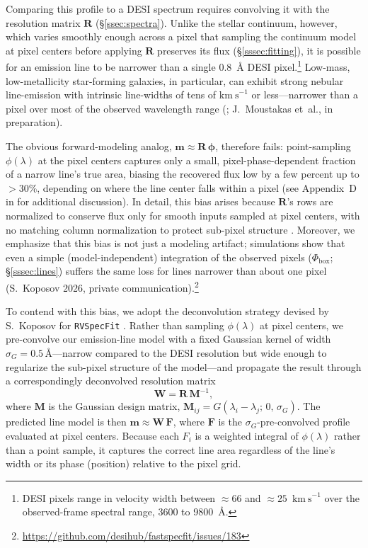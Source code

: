 \documentclass[modern,linenumbers]{aastex701}
\newcommand{\kms}{\ensuremath{\mathrm{km~s}^{-1}}}
\begin{document}
Comparing this profile to a DESI spectrum requires convolving it with
the resolution matrix $\mathbf{R}$ (\S\ref{ssec:spectra}). Unlike the
stellar continuum, however, which varies smoothly enough across a
pixel that sampling the continuum model at pixel centers before
applying $\mathbf{R}$ preserves its flux (\S\ref{sssec:fitting}), it
is possible for an emission line to be narrower than a single
0.8~\AA{} DESI pixel.\footnote{DESI pixels range in velocity width
between $\approx66$ and $\approx25$~\kms{} over the observed-frame
spectral range, 3600 to 9800~\AA.} Low-mass, low-metallicity
star-forming galaxies, in particular, can exhibit strong nebular
line-emission with intrinsic line-widths of tens of \kms{} or
less---narrower than a pixel over most of the observed wavelength
range (\citealt{scholte26a}; J.~Moustakas et~al., in preparation).

The obvious forward-modeling analog, $\mathbf{m} \approx
\mathbf{R}\,\boldsymbol{\phi}$, therefore fails: point-sampling
$\phi(\lambda)$ at the pixel centers captures only a small,
pixel-phase-dependent fraction of a narrow line's true area, biasing
the recovered flux low by a few percent up to $>$30\%, depending on
where the line center falls within a pixel (see Appendix~D in
\citealt{guy23a} for additional discussion). In detail, this bias
arises because $\mathbf{R}$'s rows are normalized to conserve flux
only for smooth inputs sampled at pixel centers, with no matching
column normalization to protect sub-pixel structure
\citep{guy23a}. Moreover, we emphasize that this bias is not just a
modeling artifact; simulations show that even a simple
(model-independent) integration of the observed pixels
($\Phi_\mathrm{box}$; \S\ref{sssec:lines}) suffers the same loss
for lines narrower than about one pixel (S.~Koposov 2026, private
communication).\footnote{\url{https://github.com/desihub/fastspecfit/issues/183}}

To contend with this bias, we adopt the deconvolution strategy devised
by S.~Koposov for \texttt{RVSpecFit} \citep{koposov19b, koposov26a}.
Rather than sampling $\phi(\lambda)$ at pixel centers, we pre-convolve
our emission-line model with a fixed Gaussian kernel of width
$\sigma_G = 0.5$\,\AA---narrow compared to the DESI resolution but
wide enough to regularize the sub-pixel structure of the model---and
propagate the result through a correspondingly deconvolved resolution
matrix
\begin{equation}
  \mathbf{W} = \mathbf{R}\,\mathbf{M}^{-1},
  \label{eq:wmatrix}
\end{equation}
where $\mathbf{M}$ is the Gaussian design matrix, $\mathbf{M}_{ij} =
G(\lambda_i - \lambda_j;\,0,\,\sigma_G)$. The predicted line model is
then $\mathbf{m} \approx \mathbf{W}\,\mathbf{F}$, where $\mathbf{F}$
is the $\sigma_G$-pre-convolved profile evaluated at pixel
centers. Because each $F_i$ is a weighted integral of $\phi(\lambda)$
rather than a point sample, it captures the correct line area
regardless of the line's width or its phase (position) relative to the
pixel grid.
\end{document}
